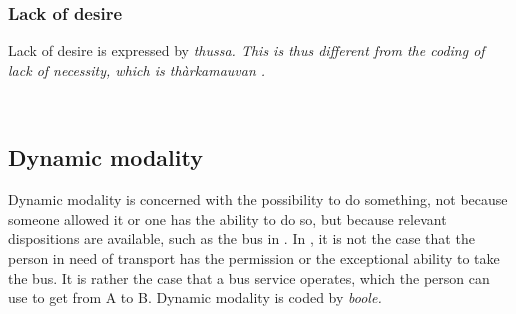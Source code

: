 





\subsubsection{Lack of desire}\label{sec:func:Lackofdesire}
Lack of desire is expressed by \em thussa\em. This is thus different from the coding of lack of necessity, which is \em thàrkamauvan \em {}.

 \\





\subsection{Dynamic modality}\label{sec:func:Dynamicmodality}
Dynamic modality is concerned with the possibility to do something, not because someone allowed it or one has the ability to do so, but because relevant dispositions are available, such as the bus in . In , it is not the case that the person in need of transport has the permission or the exceptional ability to take the bus. It is rather the case that a  bus service operates, which the person can use to get from A to B. Dynamic modality is coded by \em boole\em.
%

